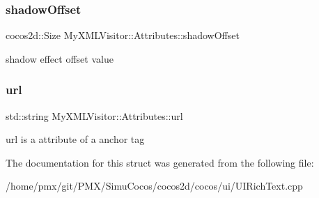 \subsubsection{\texorpdfstring{shadow\+Offset}{shadowOffset}}
{\footnotesize\ttfamily cocos2d\+::\+Size My\+X\+M\+L\+Visitor\+::\+Attributes\+::shadow\+Offset}

shadow effect offset value \mbox{\label{structMyXMLVisitor_1_1Attributes_ad50d857585d8559a33750a20c69c2843}} 
\subsubsection{\texorpdfstring{url}{url}}
{\footnotesize\ttfamily std\+::string My\+X\+M\+L\+Visitor\+::\+Attributes\+::url}

url is a attribute of a anchor tag 

The documentation for this struct was generated from the following file\+:\begin{DoxyCompactItemize}
\item 
/home/pmx/git/\+P\+M\+X/\+Simu\+Cocos/cocos2d/cocos/ui/U\+I\+Rich\+Text.\+cpp\end{DoxyCompactItemize}
